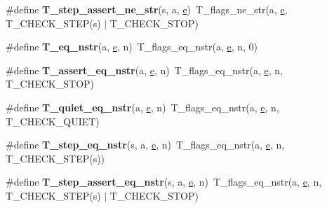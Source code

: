 \begin{DoxyCompactItemize}
\#define {\bfseries T\+\_\+step\+\_\+assert\+\_\+ne\+\_\+str}(s,  a,  \mbox{\hyperlink{sun4u_2tte_8h_a8b0b9ed08e0e18920ec2682f48228c27}{e}})~T\+\_\+flags\+\_\+ne\+\_\+str(a, \mbox{\hyperlink{sun4u_2tte_8h_a8b0b9ed08e0e18920ec2682f48228c27}{e}}, T\+\_\+\+C\+H\+E\+C\+K\+\_\+\+S\+T\+EP(s) $\vert$ T\+\_\+\+C\+H\+E\+C\+K\+\_\+\+S\+T\+OP)
\item 
\mbox{\label{group__RTEMSTestFrameworkChecksStr_ga3a4969902ca6a57dcdcf336e0c69fa0a}} 
\#define {\bfseries T\+\_\+eq\+\_\+nstr}(a,  \mbox{\hyperlink{sun4u_2tte_8h_a8b0b9ed08e0e18920ec2682f48228c27}{e}},  n)~T\+\_\+flags\+\_\+eq\+\_\+nstr(a, \mbox{\hyperlink{sun4u_2tte_8h_a8b0b9ed08e0e18920ec2682f48228c27}{e}}, n, 0)
\item 
\mbox{\label{group__RTEMSTestFrameworkChecksStr_ga48d0ed15011e5ab655d76b30b2d1561f}} 
\#define {\bfseries T\+\_\+assert\+\_\+eq\+\_\+nstr}(a,  \mbox{\hyperlink{sun4u_2tte_8h_a8b0b9ed08e0e18920ec2682f48228c27}{e}},  n)~T\+\_\+flags\+\_\+eq\+\_\+nstr(a, \mbox{\hyperlink{sun4u_2tte_8h_a8b0b9ed08e0e18920ec2682f48228c27}{e}}, n, T\+\_\+\+C\+H\+E\+C\+K\+\_\+\+S\+T\+OP)
\item 
\mbox{\label{group__RTEMSTestFrameworkChecksStr_ga4ef6282510cf6498b9a2954936b78b26}} 
\#define {\bfseries T\+\_\+quiet\+\_\+eq\+\_\+nstr}(a,  \mbox{\hyperlink{sun4u_2tte_8h_a8b0b9ed08e0e18920ec2682f48228c27}{e}},  n)~T\+\_\+flags\+\_\+eq\+\_\+nstr(a, \mbox{\hyperlink{sun4u_2tte_8h_a8b0b9ed08e0e18920ec2682f48228c27}{e}}, n, T\+\_\+\+C\+H\+E\+C\+K\+\_\+\+Q\+U\+I\+ET)
\item 
\mbox{\label{group__RTEMSTestFrameworkChecksStr_gae3f2cc6bc2299ab87c9e4c5c097f347f}} 
\#define {\bfseries T\+\_\+step\+\_\+eq\+\_\+nstr}(s,  a,  \mbox{\hyperlink{sun4u_2tte_8h_a8b0b9ed08e0e18920ec2682f48228c27}{e}},  n)~T\+\_\+flags\+\_\+eq\+\_\+nstr(a, \mbox{\hyperlink{sun4u_2tte_8h_a8b0b9ed08e0e18920ec2682f48228c27}{e}}, n, T\+\_\+\+C\+H\+E\+C\+K\+\_\+\+S\+T\+EP(s))
\item 
\mbox{\label{group__RTEMSTestFrameworkChecksStr_ga3dcbc3de5c56b7297283f412f84cd3b7}} 
\#define {\bfseries T\+\_\+step\+\_\+assert\+\_\+eq\+\_\+nstr}(s,  a,  \mbox{\hyperlink{sun4u_2tte_8h_a8b0b9ed08e0e18920ec2682f48228c27}{e}},  n)~T\+\_\+flags\+\_\+eq\+\_\+nstr(a, \mbox{\hyperlink{sun4u_2tte_8h_a8b0b9ed08e0e18920ec2682f48228c27}{e}}, n, T\+\_\+\+C\+H\+E\+C\+K\+\_\+\+S\+T\+EP(s) $\vert$ T\+\_\+\+C\+H\+E\+C\+K\+\_\+\+S\+T\+OP)

\end{DoxyCompactItemize}
